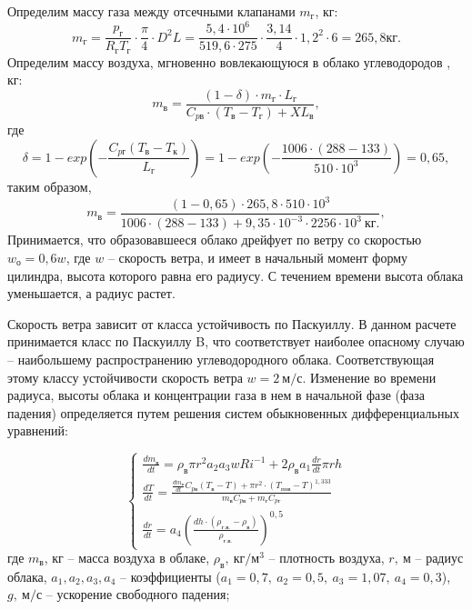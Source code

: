 Определим массу газа между отсечными клапанами $m_г$, кг:
$$
m_г = \frac{
p_г
}{
R_г T_г
} \cdot \frac{\pi}{4} \cdot D^2 L = \frac{
5,4 \cdot 10^6
}{
519,6 \cdot 275
} \cdot \frac{3,14}{4} \cdot 1,2^2 \cdot 6 = 265,8 кг.
$$
Определим массу воздуха, мгновенно вовлекающуюся в облако углеводородов , кг:
$$
m_в = \frac{
(1 - \delta) \cdot m_г \cdot L_г
}{
C_{pв} \cdot (T_в - T_г) + XL_в
},
$$
где
$$
\delta = 1 - exp\left(
-\frac{
C_{pг}(T_в - T_к)
}{
L_г
}
\right) = 1 - exp\left(
-\frac{
1006 \cdot (288 - 133)
}{
510 \cdot 10^3
}
\right) = 0,65,
$$
таким образом,
$$
m_в = \frac{
(1 - 0,65) \cdot 265,8 \cdot 510 \cdot 10^3
}{
1006 \cdot (288 - 133) + 9,35 \cdot 10^{-3} \cdot 2256 \cdot 10^3 \ кг.
},
$$
Принимается, что образовавшееся облако дрейфует по ветру со скоростью $w_о = 0,6 w$, где $w$ – скорость ветра, и имеет в начальный момент форму цилиндра, высота которого равна его радиусу. С течением времени высота облака уменьшается, а радиус растет.

Скорость ветра зависит от класса устойчивость по Паскуиллу. В данном расчете принимается класс по Паскуиллу B, что соответствует наиболее опасному случаю – наибольшему распространению углеводородного облака. Соответствующая этому классу устойчивости скорость ветра $w = 2 \ м/с$.
Изменение во времени радиуса, высоты облака и концентрации газа в нем в начальной фазе (фаза падения) определяется путем решения систем обыкновенных дифференциальных уравнений:

\[
	\left\{
	\begin{array}{ll}
		\frac{dm_в}{dt} = \rho_в \pi r^2 a_2 a_3 w Ri^{-1} + 2 \rho_в a_1 \frac{dr}{dt} \pi r h \\
		\frac{dT}{dt} = \frac{
		\frac{dm_в}{dt} C_{pв} (T_в - T) + \pi r^2 \cdot (T_{пов} - T)^{1,333}
		}{
		m_в C_{pв} + m_г C_{pг}
		}\\
		\frac{dr}{dt} = a_4 \left(
		\frac{
		dh \cdot (\rho_{г.в.} - \rho_в)
		}{
		\rho_{г.в.}
		}
		\right)^{0,5}
	\end{array}
	\right.
\]
где $m_в$, кг – масса воздуха в облаке, $\rho_в, \ кг/м^3$ – плотность воздуха, $r, \ м$ – радиус облака, $a_1, a_2, a_3, a_4$ – коэффициенты ($a_1=0,7, \ a_2=0,5, \ a_3=1,07, \ a_4=0,3$), $g, \ м/с$ – ускорение свободного падения;


